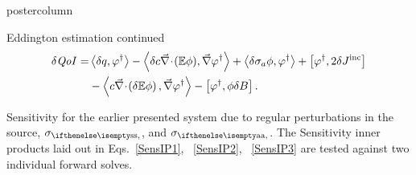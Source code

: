 \documentclass[xcolor={usenames,dvipsnames,svgnames,table}]{beamer}
\newcommand{\bra}{\left\langle}
\newcommand{\ket}{\right\rangle}
\newcommand{\sbra}{\left[}
\newcommand{\sket}{\right]}
\newcommand{\Edd}{\mathbb{E}}
\newcommand{\BEdd}{B}
\newcommand{\isigt}{c}
\newcommand{\qoi}{{\it QoI}\xspace}
\begin{document}
\begin{frame}
\begin{columns}
\begin{column}{.33\textwidth}
\begin{beamercolorbox}[center,wd=\textwidth]{postercolumn}
\begin{minipage}[T]{0.95\textwidth}
{\begin{block}{Eddington estimation continued}
\begin{equation}
\label{SensIP3}
\begin{split}
\delta \qoi =&  \bra \delta q , \varphi^\dag \ket - \bra \delta \isigt \div (\Edd \phi), \grad \varphi^\dag \ket + \bra \delta \sigma_a \phi, \varphi^\dag \ket + \sbra \varphi^\dag, 2 \delta J^{\text{inc}} \sket \\
& - \bra  \isigt \div \left( \delta \Edd \phi \right), \grad \varphi^\dag \ket
- \sbra \varphi^\dag, \phi \delta \BEdd \sket.
\end{split}
\end{equation}			    
			    
Sensitivity for the earlier presented system due to regular perturbations in the source, $\sigs$, and $\siga$. The Sensitivity inner products laid out in Eqs.~\eqref{SensIP1}, ~\eqref{SensIP2}, ~\eqref{SensIP3} are tested against two individual forward solves.
 

\end{block}}
\end{minipage}
\end{beamercolorbox}
\end{column}
\end{columns}
\end{frame}
\end{document}

